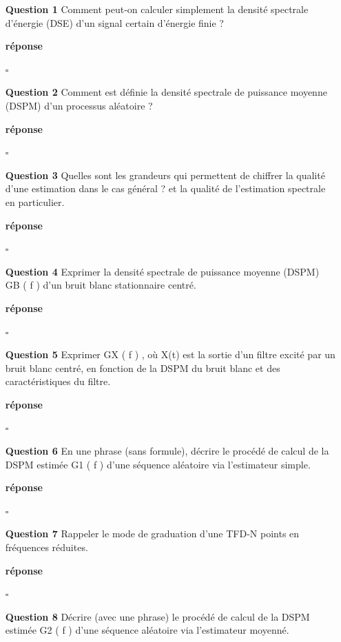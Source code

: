 \documentclass{article}
\newcommand{\debutrep}[1]{\color{blue}\begin{center} \hrulefill \textbf{ #1 } \hrulefill \end{center} }
\newcommand{\finrep}{\vspace*{5mm}\hfill $\square$\color{black}\vspace*{5mm}}
\begin{document}
\begin{itemize}
\item[{\bf Question 1}] Comment peut-on calculer simplement la densité spectrale d’énergie (DSE) d’un signal certain d’énergie finie ?

\debutrep{réponse}

\finrep

\item[{\bf Question 2}] Comment est définie la densité spectrale de puissance moyenne (DSPM) d’un processus aléatoire ?

\debutrep{réponse}

\finrep

\item[{\bf Question 3}] Quelles sont les grandeurs qui permettent de chiffrer la qualité d’une estimation dans le cas général ? et la qualité de l’estimation spectrale en particulier.

\debutrep{réponse}

\finrep

\item[{\bf Question 4}] Exprimer la densité spectrale de puissance moyenne (DSPM) GB ( f ) d’un bruit blanc stationnaire centré.

\debutrep{réponse}

\finrep

\item[{\bf Question 5}] Exprimer GX ( f ) , où X(t) est la sortie d’un filtre excité par un bruit blanc centré, en fonction de la DSPM du bruit blanc et des caractéristiques du filtre.

\debutrep{réponse}

\finrep

\item[{\bf Question 6}] En une phrase (sans formule), décrire le procédé de calcul de la DSPM estimée G1 ( f )
d’une séquence aléatoire via l’estimateur simple.

\debutrep{réponse}

\finrep

\item[{\bf Question 7}] Rappeler le mode de graduation d’une TFD-N points en fréquences réduites.

\debutrep{réponse}

\finrep

\item[{\bf Question 8}] Décrire (avec une phrase) le procédé de calcul de la DSPM estimée G2 ( f ) d’une
séquence aléatoire via l’estimateur moyenné.


\end{itemize}
\end{document}
